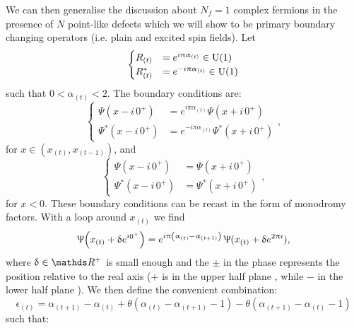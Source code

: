 We can then generalise the discussion about $N_f = 1$ complex fermions in the presence of $N$ point-like defects which we will show to be primary boundary changing operators (i.e. plain and excited spin fields).
Let
\begin{equation}
  \begin{cases}
    R_{(t)} & = e^{i \uppi \upalpha_{( t )}} \in \mathrm{U}( 1 )
    \\
    R_{(t)}^* & = e^{-i \uppi \upalpha_{( t )}} \in \mathrm{U}( 1 )
  \end{cases}
\end{equation}
such that $0 < \alpha_{( t )} < 2$. The boundary conditions are:
\begin{equation}
  \begin{cases}
    \Psi( x - i\, 0^+ ) & =  e^{i \pi \alpha_{( t )}} \Psi( x + i\, 0^+)
    \\
    \Psi^*( x - i\, 0^+ ) & = e^{-i \pi \alpha_{( t )}} \Psi^*( x + i\, 0^+ )
  \end{cases},
\end{equation}
for $x \in ( x_{(t)}, x_{(t-1)} )$, and
\begin{equation}
  \begin{cases}
    \Psi( x - i\, 0^+ ) & =  \Psi( x + i\, 0^+)
    \\
    \Psi^*( x - i\, 0^+ ) & = \Psi^*( x + i\, 0^+ )
  \end{cases},
\end{equation}
for $x < 0$.
These boundary conditions can be recast in the form of monodromy factors.
With a loop around $x_{(t)}$ we find
\begin{equation}
  \Uppsi\qty( x_{(t)} + \updelta e^{i 0^+} )
  =
  e^{i \uppi \qty( \upalpha_{( t )} - \upalpha_{( t + 1 )} )}\,
  \Uppsi( x_{(t)} + \updelta e^{2 \uppi i} ),
\end{equation}
where $\delta \in \R^+$ is small enough and the $\pm$ in the phase represents the position relative to the real axis ($+$ is in the upper half plane \ccH, while $-$ in the lower half plane \bccH).\footnotemark{}
We then define the convenient combination:
\begin{equation}
  \epsilon_{(t)}
  =
  \alpha_{( t+1 )} - \alpha_{( t )}
  +
  \theta( \alpha_{( t )} -\alpha_{( t+1 )} - 1 )
  -
  \theta( \alpha_{( t+1 )} - \alpha_{( t )} - 1 )
\end{equation}
such that:\footnotemark{}
